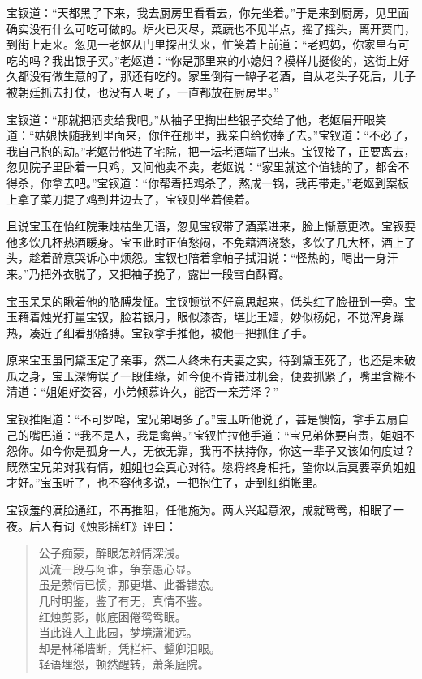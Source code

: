 \documentclass[12pt,oneside]{book}
\newenvironment{shici}{%
\begin{verse}%
\centering\large\hspace{12pt}}%
{\end{verse}}
\begin{document}
宝钗道：“天都黑了下来，我去厨房里看看去，你先坐着。”于是来到厨房，见里面确实没有什么可吃可做的。炉火已灭尽，菜蔬也不见半点，摇了摇头，离开贾门，到街上走来。忽见一老妪从门里探出头来，忙笑着上前道：“老妈妈，你家里有可吃的吗？我出银子买。”老妪道：“你是那里来的小媳妇？模样儿挺俊的，这街上好久都没有做生意的了，那还有吃的。家里倒有一罈子老酒，自从老头子死后，儿子被朝廷抓去打仗，也没有人喝了，一直都放在厨房里。”

宝钗道：“那就把酒卖给我吧。”从袖子里掏出些银子交给了他，老妪眉开眼笑道：“姑娘快随我到里面来，你住在那里，我亲自给你捧了去。”宝钗道：“不必了，我自己抱的动。”老妪带他进了宅院，把一坛老酒端了出来。宝钗接了，正要离去，忽见院子里卧着一只鸡，又问他卖不卖，老妪说：“家里就这个值钱的了，都舍不得杀，你拿去吧。”宝钗道：“你帮着把鸡杀了，熬成一锅，我再带走。”老妪到案板上拿了菜刀提了鸡到井边去了，宝钗则坐着候着。

且说宝玉在怡红院秉烛枯坐无语，忽见宝钗带了酒菜进来，脸上惭意更浓。宝钗要他多饮几杯热酒暖身。宝玉此时正值愁闷，不免藉酒浇愁，多饮了几大杯，酒上了头，趁着醉意哭诉心中烦怨。宝钗也陪着拿帕子拭泪说：“怪热的，喝出一身汗来。”乃把外衣脱了，又把袖子挽了，露出一段雪白酥臂。

宝玉呆呆的瞅着他的胳膊发怔。宝钗顿觉不好意思起来，低头红了脸扭到一旁。宝玉藉着烛光打量宝钗，脸若银月，眼似漆杏，堪比王嫱，妙似杨妃，不觉浑身躁热，凑近了细看那胳膊。宝钗拿手推他，被他一把抓住了手。

原来宝玉虽同黛玉定了亲事，然二人终未有夫妻之实，待到黛玉死了，也还是未破瓜之身，宝玉深悔误了一段佳缘，如今便不肯错过机会，便要抓紧了，嘴里含糊不清道：“姐姐好姿容，小弟倾慕许久，能否一亲芳泽？”

宝钗推阻道：“不可罗唣，宝兄弟喝多了。”宝玉听他说了，甚是懊恼，拿手去扇自己的嘴巴道：“我不是人，我是禽兽。”宝钗忙拉他手道：“宝兄弟休要自责，姐姐不怨你。如今你是孤身一人，无依无靠，我再不扶持你，你这一辈子又该如何度过？既然宝兄弟对我有情，姐姐也会真心对待。愿将终身相托，望你以后莫要辜负姐姐才好。”宝玉听了，也不容他多说，一把抱住了，走到红绡帐里。

宝钗羞的满脸通红，不再推阻，任他施为。两人兴起意浓，成就鸳鸯，相眠了一夜。后人有词《烛影摇红》评曰：

\begin{shici}
公子痴蒙，醉眼怎辨情深浅。\\
风流一段与阿谁，争奈愚心显。\\
虽是萦情已惯，那更堪、此番错恋。\\
几时明鉴，鉴了有无，真情不鉴。\\
红烛剪影，帐底困倦鸳鸯眠。\\
当此谁人主此园，梦境潇湘远。\\
却是林稀墻断，凭栏杆、颦卿泪眼。\\
轻语埋怨，顿然醒转，萧条庭院。
\end{shici}
\end{document}
